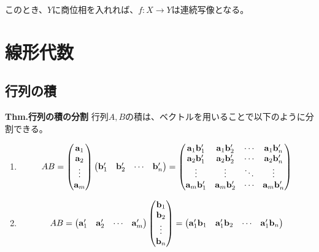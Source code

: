 \documentclass[a4paper,11pt]{jsarticle}
\numberwithin{equation}{section}
\begin{document}
このとき、$Y$に商位相を入れれば、$f:X \to Y$は連続写像となる。\\

\section{線形代数}
\subsection{行列の積}
\begin{itembox}[l]{\textbf{Thm.行列の積の分割}}
  行列$A,B$の積は、ベクトルを用いることで以下のように分割できる。
  \begin{enumerate}
    \item 
    \begin{align}
      AB = \begin{pmatrix}
        \vb{a}_1\\
        \vb{a}_2\\
        \vdots\\
        \vb{a}_m
      \end{pmatrix}
      \begin{pmatrix}
        \vb{b}'_1 & \vb{b}'_2 & \cdots & \vb{b}'_n
      \end{pmatrix}
      =
      \begin{pmatrix}
        \vb{a}_1 \vb{b}'_1 & \vb{a}_1 \vb{b}'_2 & \cdots & \vb{a}_1 \vb{b}'_n\\
        \vb{a}_2 \vb{b}'_1 & \vb{a}_2 \vb{b}'_2 & \cdots & \vb{a}_2 \vb{b}'_n\\
        \vdots & \vdots & \ddots & \vdots\\
        \vb{a}_m \vb{b}'_1 & \vb{a}_m \vb{b}'_2 & \cdots & \vb{a}_m \vb{b}'_n
      \end{pmatrix}
    \end{align}
  \item 
  \begin{align}
    AB = \begin{pmatrix}
      \vb{a}'_1 & \vb{a}'_2 & \cdots & \vb{a}'_m
    \end{pmatrix}
    \begin{pmatrix}
      \vb{b}_1\\
      \vb{b}_2\\
      \vdots\\
      \vb{b}_n
    \end{pmatrix}  
    =
    \begin{pmatrix}
      \vb{a}'_1 \vb{b}_1 & \vb{a}'_1 \vb{b}_2 & \cdots & \vb{a}'_1 \vb{b}_n\\

\end{pmatrix}
\end{align}
\end{enumerate}
\end{itembox}
\end{document}
